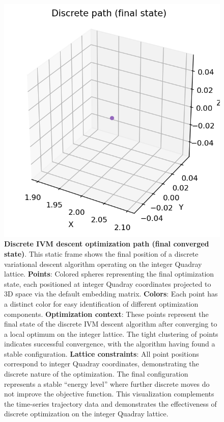 \documentclass[
  10pt,
]{article}
\begin{document}
\begin{figure}
\centering
\includegraphics{../output/figures/discrete_path_final.png}
\caption{\textbf{Discrete IVM descent optimization path (final converged
state)}. This static frame shows the final position of a discrete
variational descent algorithm operating on the integer Quadray lattice.
\textbf{Points}: Colored spheres representing the final optimization
state, each positioned at integer Quadray coordinates projected to 3D
space via the default embedding matrix. \textbf{Colors}: Each point has
a distinct color for easy identification of different optimization
components. \textbf{Optimization context}: These points represent the
final state of the discrete IVM descent algorithm after converging to a
local optimum on the integer lattice. The tight clustering of points
indicates successful convergence, with the algorithm having found a
stable configuration. \textbf{Lattice constraints}: All point positions
correspond to integer Quadray coordinates, demonstrating the discrete
nature of the optimization. The final configuration represents a stable
``energy level'' where further discrete moves do not improve the
objective function. This visualization complements the time-series
trajectory data and demonstrates the effectiveness of discrete
optimization on the integer Quadray lattice.}
\end{figure}
\end{document}

